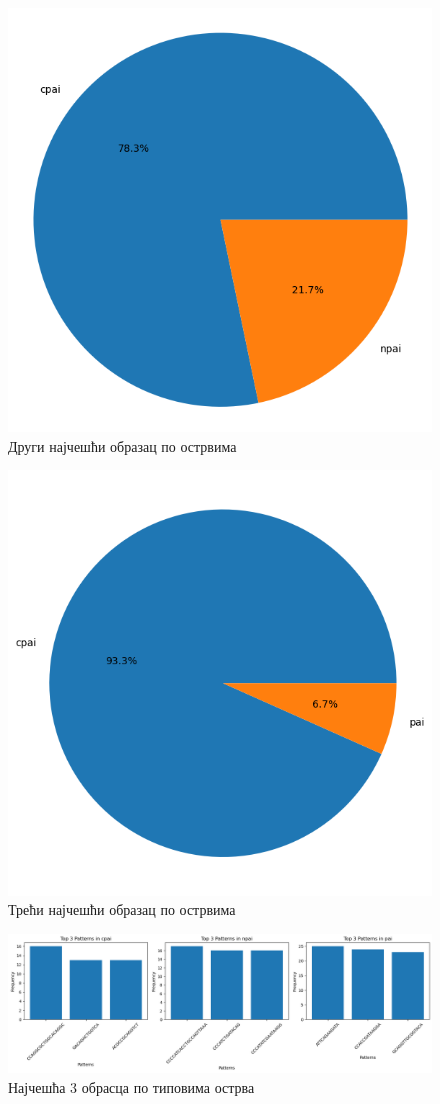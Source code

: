 \documentclass[12pt]{article}
\begin{document}
\begin{figure}[h]
    \centering
    \includegraphics[width=0.5\linewidth]{images/top_2_by_islands.png}
    \caption{Други најчешћи образац по острвима}
    \label{fig:top2}
\end{figure}

\begin{figure}[h]
    \centering
    \includegraphics[width=0.5\linewidth]{images/top_3_by_islands.png}
    \caption{Трећи најчешћи образац по острвима}
    \label{fig:top3}
\end{figure}


\begin{figure}[h]
    \centering
    \includegraphics[width=\linewidth]{images/top_3_cpai.png}
    \caption{Најчешћа 3 обрасца по типовима острва}
    \label{fig:top3_by_islands}
\end{figure}

\newpage

\end{document}
